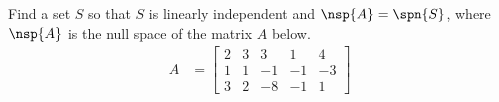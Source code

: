 Find  a set $S$ so that $S$ is linearly independent and $\nsp{A}=\spn{S}$, where $\nsp{A}$ is the null space of the matrix $A$ below.
%
\begin{align*}
A&=
\begin{bmatrix}
2 & 3 & 3 & 1 & 4 \\
1 & 1 & -1 & -1 & -3 \\
3 & 2 & -8 & -1 & 1
\end{bmatrix}
\end{align*}